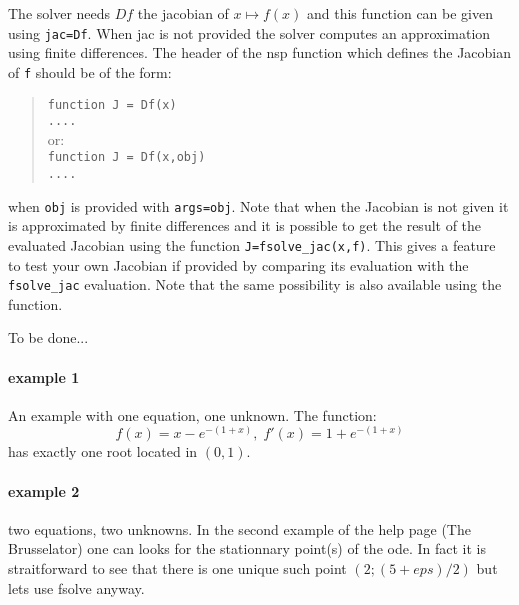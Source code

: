\begin{mandescription}
The solver needs $Df$ the jacobian of $x \mapsto f(x)$ and this function can be given using 
\verb+jac=Df+. When jac is not provided the solver computes an approximation using finite differences. 
The header of the nsp function which defines the Jacobian of \verb+f+ should be of the form:
\begin{quote}
{\tt function J = Df(x) \\
      ....}\\
or:\\
{\tt function J = Df(x,obj) \\
     ....}
\end{quote}
when {\tt obj} is provided with {\tt args=obj}. 
Note that when the Jacobian is not given it is approximated by finite differences and it is 
possible to get the result of the evaluated Jacobian using the function \verb+J=fsolve_jac(x,f)+.
This gives a feature to test your own Jacobian if provided by comparing its evaluation with the 
\verb+fsolve_jac+ evaluation. Note that the same possibility is also available using the 
 function. 

To be done...
\end{mandescription} 

\begin{examples}
  
\paragraph{example 1} An example with one equation, one unknown. The function:
$$
  f(x) = x - e^{-(1+x)}, \; f'(x) = 1 + e^{-(1+x)}
$$ 
has exactly one root located in $(0,1)$.
\begin{program}
\end{program}
 
\paragraph{example 2} two equations, two unknowns. In the second example
of the  help page (The Brusselator) one can looks for
the stationnary point(s) of the ode. In fact it is straitforward to see
that there is one unique such point $(2;(5+eps)/2)$ but lets use fsolve
anyway.
\begin{program}
\end{program}
\end{examples}

